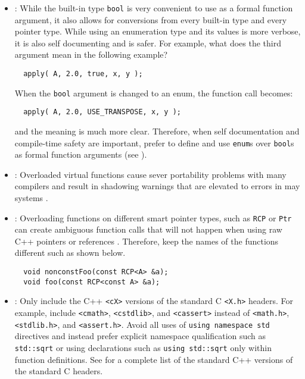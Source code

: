 \begin{itemize}
{}\item\GCGEnumFuncArgs: While the built-in type {}\texttt{bool} is very
convenient to use as a formal function argument, it also allows for
conversions from every built-in type and every pointer type.  While using an
enumeration type and its values is more verbose, it is also self documenting
and is safer.  For example, what does the third argument mean in the following
example?

{\small\begin{verbatim}
  apply( A, 2.0, true, x, y );\end{verbatim}}

When the {}\texttt{bool} argument is changed to an enum, the function call
becomes:

{\small\begin{verbatim}
  apply( A, 2.0, USE_TRANSPOSE, x, y );
\end{verbatim}}

and the meaning is much more clear.  Therefore, when self
documentation and compile-time safety are important, prefer to define
and use {}\texttt{enum}s over {}\texttt{bool}s as formal function
arguments (see {}\cite[Section 12.6]{CodeComplete2nd04}).

{}\item\GCGOverloadedVirtualFunctions: Overloaded virtual functions
cause sever portability problems with many compilers and result in
shadowing warnings that are elevated to errors in may systems
{}\cite[Item 33]{EffectiveC++3rd05}.


{}\item\GCGAvoidSmartPtrFuncOverloads: Overloading functions on different
smart pointer types, such as {}\texttt{RCP} or {}\texttt{Ptr} can create
ambiguous function calls that will not happen when using raw C++ pointers or
references {}\cite{TeuchosMemoryManagementGuide}.  Therefore, keep the names
of the functions different such as shown below.

{\small\begin{verbatim}
  void nonconstFoo(const RCP<A> &a);
  void foo(const RCP<const A> &a);
\end{verbatim}}


{}\item\GCGStandardCppHeaders: Only include the C++ {}\texttt{<cX>} versions
of the standard C {}\texttt{<X.h>} headers.  For example, include
{}\texttt{<cmath>}, {}\texttt{<cstdlib>}, and {}\texttt{<cassert>} instead of
{}\texttt{<math.h>}, {}\texttt{<stdlib.h>}, and {}\texttt{<assert.h>}.  Avoid
all uses of {}\texttt{using namespace std} directives and instead prefer
explicit namespace qualification such as {}\texttt{std::sqrt} or using
declarations such as {}\texttt{using std::sqrt} only within function
definitions.  See {}\cite[Section 16.1.2]{stroustrup97} for a complete list of
the standard C++ versions of the standard C headers.


\end{itemize}
